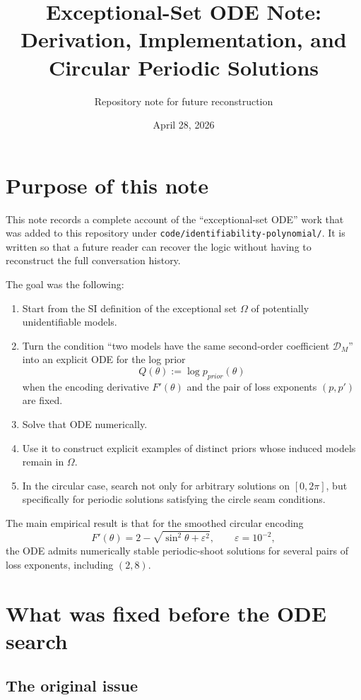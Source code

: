\documentclass[11pt]{article}
\title{Exceptional-Set ODE Note:\\
Derivation, Implementation, and Circular Periodic Solutions}
\author{Repository note for future reconstruction}
\date{April 28, 2026}
\newcommand{\Prior}{p_{prior}}
\begin{document}
\maketitle

\section{Purpose of this note}

This note records a complete account of the ``exceptional-set ODE'' work that was added to this repository under \texttt{code/identifiability-polynomial/}. It is written so that a future reader can recover the logic without having to reconstruct the full conversation history.

The goal was the following:
\begin{enumerate}
\item Start from the SI definition of the exceptional set $\Omega$ of potentially unidentifiable models.
\item Turn the condition ``two models have the same second-order coefficient $\mathcal{D}_M$'' into an explicit ODE for the log prior
\[
Q(\theta) := \log \Prior(\theta)
\]
when the encoding derivative $F'(\theta)$ and the pair of loss exponents $(p,p')$ are fixed.
\item Solve that ODE numerically.
\item Use it to construct explicit examples of distinct priors whose induced models remain in $\Omega$.
\item In the circular case, search not only for arbitrary solutions on $[0,2\pi]$, but specifically for periodic solutions satisfying the circle seam conditions.
\end{enumerate}

The main empirical result is that for the smoothed circular encoding
\[
F'(\theta)=2-\sqrt{\sin^2\theta+\varepsilon^2},
\qquad \varepsilon = 10^{-2},
\]
the ODE admits numerically stable periodic-shoot solutions for several pairs of loss exponents, including $(2,8)$.

\section{What was fixed before the ODE search}

\subsection{The original issue}
\end{document}
